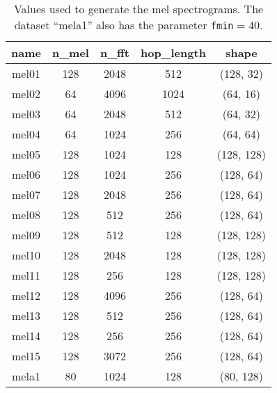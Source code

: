 \begin{table}[H]
    \centering
    \caption{
    Values used to generate the mel spectrograms. The dataset ``mela1'' also
has the parameter \texttt{fmin}$=40$.}
    \label{tab:mel_values}
    \begin{tabular}{|c|cccc|}
        \hline
        name & n\_mel & n\_fft & hop\_length & shape \\
        \hline
        mel01 & 128 & 2048 & 512   & (128, 32) \\
        mel02 & 64  & 4096 & 1024  & (64, 16) \\
        mel03 & 64  & 2048 & 512   & (64, 32) \\
        mel04 & 64  & 1024 & 256   & (64, 64) \\
        mel05 & 128 & 1024 & 128   & (128, 128) \\
        mel06 & 128 & 1024 & 256   & (128, 64) \\
        mel07 & 128 & 2048 & 256   & (128, 64) \\
        mel08 & 128 & 512  & 256   & (128, 64) \\
        mel09 & 128 & 512  & 128   & (128, 128) \\
        mel10 & 128 & 2048 & 128   & (128, 128) \\
        mel11 & 128 & 256  & 128   & (128, 128) \\
        mel12 & 128 & 4096 & 256   & (128, 64) \\
        mel13 & 128 & 512  & 256   & (128, 64) \\
        mel14 & 128 & 256  & 256   & (128, 64) \\
        mel15 & 128 & 3072 & 256   & (128, 64) \\
        mela1 & 80  & 1024 & 128   & (80, 128) \\
        \hline
    \end{tabular}
\end{table}

